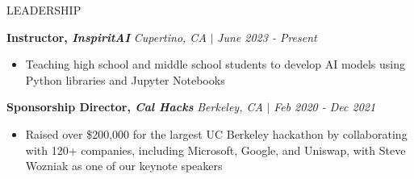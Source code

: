 \documentclass{resume} %
\begin{document}
\vspace{-2mm}
\begin{rSection}{LEADERSHIP}

\textbf{Instructor, \textit{InspiritAI}} \hfill {\it Cupertino, CA} \(|\) {\it June 2023 - Present}
\begin{itemize}
    \itemsep -0.5em \vspace{-0.5em}
    \item Teaching high school and middle school students to develop AI models using Python libraries and Jupyter Notebooks
\end{itemize}

\textbf{Sponsorship Director, \textit{Cal Hacks}} \hfill {\it Berkeley, CA} \(|\) {\it Feb 2020 - Dec 2021}
\begin{itemize}
    \itemsep -0.5em \vspace{-0.5em}
    \item Raised over \$200,000 for the largest UC Berkeley hackathon by collaborating with 120+ companies, including Microsoft, Google, and Uniswap, with Steve Wozniak as one of our keynote speakers
\end{itemize}
\end{rSection}
\end{document}
